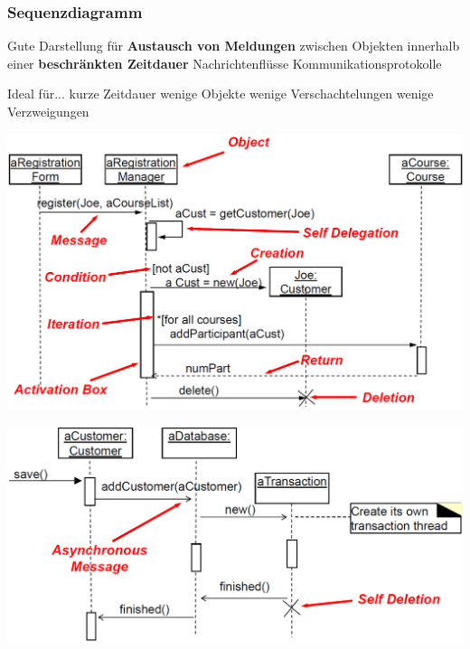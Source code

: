 \subsubsection{Sequenzdiagramm}
\label{Sequenzdiagramm}

\begin{minipage}[t]{0.48\columnwidth}
    \begin{outline}
        \1 Gute Darstellung für \textbf{Austausch von Meldungen} zwischen Objekten innerhalb einer \textbf{beschränkten Zeitdauer}
            \2 Nachrichtenflüsse
            \2 Kommunikationsprotokolle
    \end{outline}
\end{minipage}
\hfill
\begin{minipage}[t]{0.48\columnwidth}
    \begin{outline}
        \1 Ideal für...
            \2 kurze Zeitdauer
            \2 wenige Objekte
            \2 wenige Verschachtelungen
            \2 wenige Verzweigungen
    \end{outline}
\end{minipage}


\begin{center}
    \includegraphics[width=0.9\columnwidth]{images/sequenzdiagramm_elemente_1.png}

    \vspace{0.3cm}

    \includegraphics[width=0.9\columnwidth]{images/sequenzdiagramm_elemente_2.png}
\end{center}



